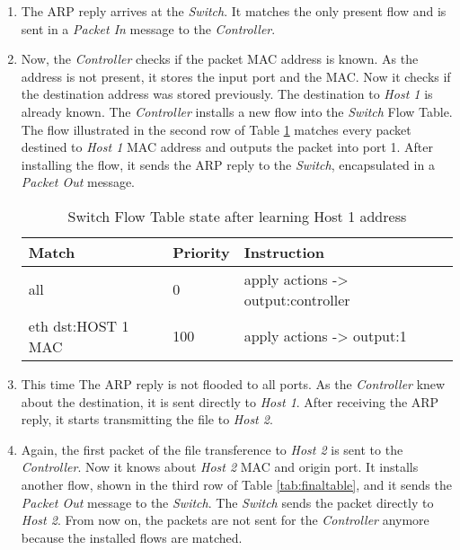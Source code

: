 \begin{enumerate}
\item The ARP reply arrives at the \textit{Switch}. It matches the only present flow and is sent in a \textit{Packet In} message to the  \textit{Controller}.   

\item Now, the  \textit{Controller} checks if the packet MAC address is known. As the address is not present, it stores the input port and the MAC. Now it checks if the destination address was stored previously. The destination to \textit{Host 1} is already known. The  \textit{Controller} installs a new flow into the \textit{Switch} Flow Table. The flow illustrated in the second row of Table \ref{tab:secondtable} matches every packet destined to \textit{Host 1} MAC address and outputs the packet into port 1. After installing the flow, it sends the ARP reply to the \textit{Switch}, encapsulated in a \textit{Packet Out} message.

\begin{table}[h]
\centering
\caption{Switch Flow Table state after learning Host 1 address}
\label{tab:secondtable}
\begin{tabular}{|l|l|l|}
\hline
\textbf{Match}                 & \textbf{Priority}   & \textbf{Instruction}                              \\ \hline
all                            & 0                   & apply actions -> output:controller                \\ \hline
eth dst:HOST 1 MAC             & 100                 & apply actions -> output:1                         \\ \hline
\end{tabular}
\end{table}

\item This time The ARP reply is not flooded to all ports. As the  \textit{Controller} knew about the destination, it is sent directly to \textit{Host 1}. After receiving the ARP reply, it starts transmitting the file to \textit{Host 2}.

\item Again, the first packet of the file transference to \textit{Host 2} is sent to the  \textit{Controller}. Now it knows about \textit{Host 2} MAC and origin port. It installs another flow, shown in the third row of Table \ref{tab:finaltable}, and it sends the \textit{Packet Out} message to the \textit{Switch}. The \textit{Switch} sends the packet directly to \textit{Host 2}. From now on, the packets are not  sent for the \textit{Controller} anymore because the installed flows are matched. 


\end{enumerate}

